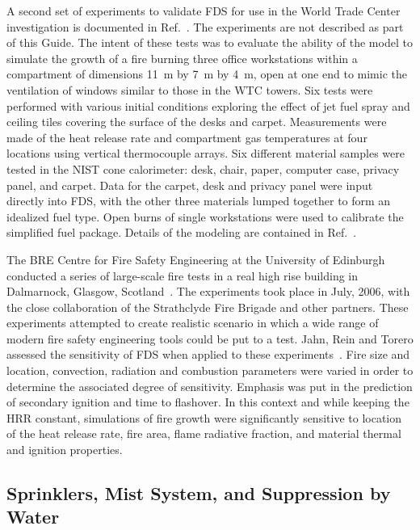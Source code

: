 A second set of experiments to validate FDS for use in the World Trade Center  investigation is  documented  in Ref.~\cite{NIST_NCSTAR_1-5E}.  The experiments
are not described as part of this Guide. The intent
of  these tests  was to  evaluate the ability  of the  model to simulate the growth  of a fire burning three  office workstations within a compartment of
dimensions 11~m by 7~m by 4~m, open at one end to mimic the ventilation  of windows similar to  those in  the WTC towers. Six tests  were performed
with various  initial conditions  exploring the effect of jet fuel spray and ceiling tiles covering the surface of the desks and carpet. Measurements
were  made of the heat release rate and compartment  gas   temperatures  at  four   locations  using  vertical thermocouple arrays. Six different
material samples were tested in the NIST  cone calorimeter:  desk,  chair, paper,  computer case,  privacy panel, and  carpet. Data for the  carpet,
desk and  privacy panel were input directly into FDS, with the other three materials lumped together to form an  idealized fuel type.  Open burns of
single  workstations were used to  calibrate the simplified fuel  package. Details of the modeling are contained in Ref.~\cite{NIST_NCSTAR_1-5F}.


The BRE Centre for Fire Safety Engineering at the University of Edinburgh conducted a series of large-scale fire tests in a real high rise building in Dalmarnock, Glasgow,
Scotland~\cite{Rein:Dalmarnock,Rein:FSJ}.
The experiments took place in July, 2006, with the close collaboration of the Strathclyde Fire Brigade and other partners.
These experiments attempted to create realistic scenario in which a wide range of modern fire safety engineering tools could be put to a test.
Jahn, Rein and Torero assessed the sensitivity of FDS when applied to these experiments~\cite{Jahn:IAFSS9}. Fire size and
location, convection, radiation and combustion parameters were varied in order to determine the associated
degree of sensitivity. Emphasis was put in the prediction of secondary ignition and time to flashover. In this
context and while keeping the HRR constant, simulations of fire growth were significantly sensitive to
location of the heat release rate, fire area, flame radiative fraction, and material thermal and ignition
properties.



\subsection{Sprinklers, Mist System, and Suppression by Water}

